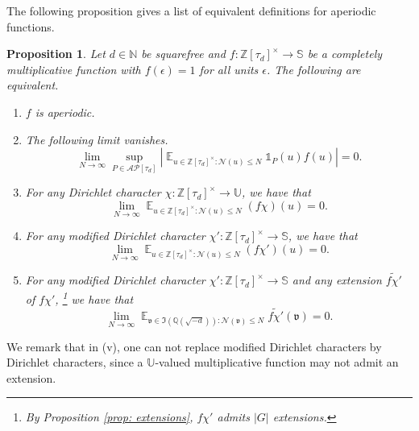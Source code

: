\documentclass[11pt]{amsart}
\newtheorem{proposition}[lemma]{Proposition}
\theoremstyle{definition}
\DeclareMathOperator*{\E}{\mathbb{E}}
\newcommand{\N}{{\mathbb N}}
\newcommand{\NN}{{\mathcal N}}
\newcommand{\Q}{{\mathbb Q}}
\renewcommand{\S}{\mathbb{S}}
\newcommand{\Z}{{\mathbb Z}}
\newcommand{\U}{{\mathbb U}}
\newcommand{\e}{\epsilon}
\begin{document}
The following proposition gives a list of equivalent definitions for aperiodic functions.
\begin{proposition}\label{prop: dircharequivalence}
 Let $d\in\N$ be squarefree and $f\colon \Z[\tau_{d}]^{\times}\to\S$ be a completely multiplicative function with  $f(\e)=1$ for all units $\e$. 
    The following are equivalent. 
    \begin{enumerate}
        \item $f$ is aperiodic.
        \item The following limit vanishes.
        $$\lim_{N\to\infty}\sup_{P\in \mathcal{AP}[\tau_{d}]}\left|\E_{u\in\Z[\tau_{d}]^{\times}\colon \NN(u)\leq N}\mathds{1}_{P}(u)f(u)\right|=0.$$
        \item For any Dirichlet character $\chi\colon \Z[\tau_{d}]^{\times}\to\U$, we have that 
        \begin{equation}\nonumber%
        \lim_{N\to\infty}\E_{u\in\Z[\tau_{d}]^{\times}\colon \NN(u)\leq N}(f\chi)(u)=0.
        \end{equation}
         \item For any modified Dirichlet character $\chi'\colon \Z[\tau_{d}]^{\times}\to\S$, we have that $$\lim_{N\to\infty}\E_{u\in\Z[\tau_{d}]^{\times}\colon \NN(u)\leq N}(f\chi')(u)=0.$$
        \item For any modified Dirichlet character $\chi'\colon \Z[\tau_{d}]^{\times}\to\S$ %
        and any extension $\widetilde{f\chi'}$ of $f\chi'$,%
       \footnote{By Proposition \ref{prop: extensions}, $f\chi'$ admits $\vert G\vert$ extensions.}
        we have that 
        $$\lim_{N\to\infty}\E_{\mathfrak{v}\in \mathfrak{I}(\Q(\sqrt{-d}))\colon \NN(\mathfrak{v})\leq N}\widetilde{f\chi'}(\mathfrak{v})=0.$$
    \end{enumerate}
\end{proposition}

We remark that in (v), one can not replace modified Dirichlet characters by Dirichlet characters, since a $\U$-valued multiplicative function may not admit an extension.
\iffalse
\end{document}
